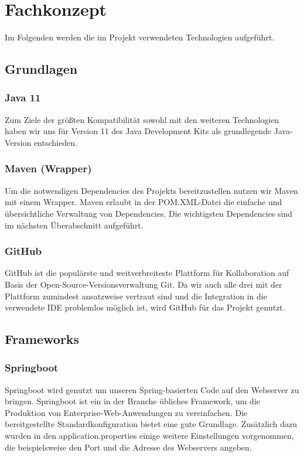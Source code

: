 

\section{Fachkonzept}
\label{Technologien}

Im Folgenden werden die im Projekt verwendeten Technologien aufgeführt.

\subsection{Grundlagen}

\subsubsection{Java 11}
Zum Ziele der größten Kompatibilität sowohl mit den weiteren Technologien haben wir uns für Version 11 des Java Development Kits als grundlegende Java-Version entschieden.

\subsubsection{Maven (Wrapper)}
Um die notwendigen Dependencies des Projekts bereitzustellen nutzen wir Maven mit einem Wrapper. Maven erlaubt in der POM.XML-Datei die einfache und übersichtliche Verwaltung von Dependencies. Die wichtigsten Dependencies sind im nächsten Überabschnitt aufgeführt.

\subsubsection{GitHub}
GitHub ist die populärste und weitverbreiteste Plattform für Kollaboration auf Basis der Open-Source-Versionsverwaltung Git. Da wir auch alle drei mit der Plattform zumindest ansatzweise vertraut sind und die Integration in die verwendete IDE problemlos möglich ist, wird GitHub für das Projekt genutzt.

\subsection{Frameworks}
%

\subsubsection{Springboot}
Springboot wird genutzt um unseren Spring-basierten Code auf den Webserver zu bringen. Springboot ist ein in der Branche übliches Framework, um die Produktion von Enterprise-Web-Anwendungen zu vereinfachen. Die bereitgestellte Standardkonfiguration bietet eine gute Grundlage. Zusätzlich dazu wurden in den \glqq{}application.properties\grqq{} einige weitere Einstellungen vorgenommen, die beispielsweise den Port und die Adresse des Webservers angeben.

